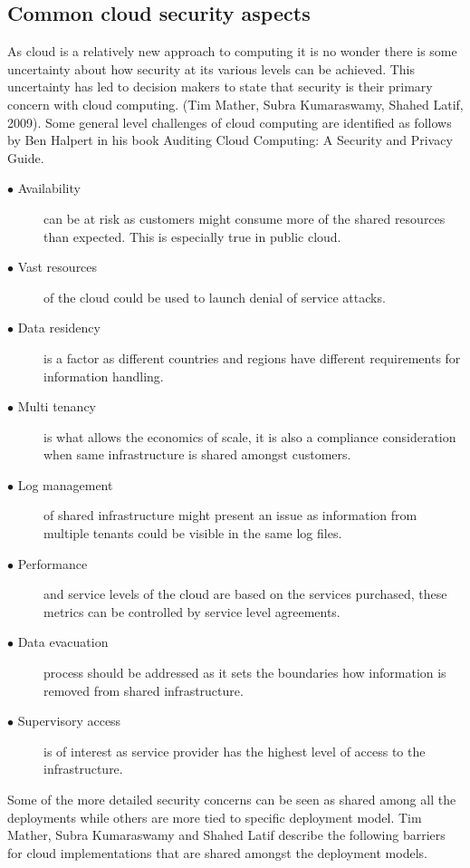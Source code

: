 \documentclass{article}
\begin{document}
\subsection{Common cloud security aspects}
As cloud is a relatively new approach to computing it is no wonder there is some uncertainty about how security at its various levels can be achieved. This uncertainty has led to decision makers to state that security is their primary concern with cloud computing. (Tim Mather, Subra Kumaraswamy, Shahed Latif, 2009). 
Some general level challenges of cloud computing are identified as follows by Ben Halpert in his book Auditing Cloud Computing: A Security and Privacy Guide.
\begin{description}
	\item[$\bullet$ Availability] can be at risk as customers might consume more of the shared resources than expected. This is especially true in public cloud.
	\item[$\bullet$ Vast resources] of the cloud could be used to launch denial of service attacks.
	\item[$\bullet$ Data residency] is a factor as different countries and regions have different requirements for information handling.
	\item[$\bullet$ Multi tenancy] is what allows the economics of scale, it is also a compliance consideration when same infrastructure is shared amongst customers.
	\item[$\bullet$ Log management] of shared infrastructure might present an issue as information from multiple tenants could be visible in the same log files. 
	\item[$\bullet$ Performance] and service levels of the cloud are based on the services purchased, these metrics can be controlled by service level agreements.
	\item[$\bullet$ Data evacuation] process should be addressed as it sets the boundaries how information is removed from shared infrastructure.
	\item[$\bullet$ Supervisory access] is of interest as service provider has the highest level of access to the infrastructure.
\end{description}
Some of the more detailed security concerns can be seen as shared among all the deployments while others are more tied to specific deployment model.
Tim Mather, Subra Kumaraswamy and Shahed Latif describe the following barriers for cloud implementations that are shared amongst the deployment models.
\end{document}
